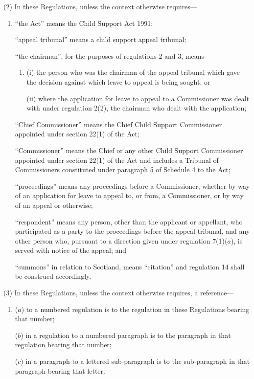 \documentclass[12pt,a4paper]{article}
\begin{document}
(2) In these Regulations, unless the context otherwise requires—
\begin{enumerate}\item[]
“the Act” means the Child Support Act 1991;

“appeal tribunal” means a child support appeal tribunal;

“the chairman”, for the purposes of regulations 2 and 3, means—
\begin{enumerate}\item[]
(i) the person who was the chairman of the appeal tribunal which gave the decision against which leave to appeal is being sought; or

(ii) where the application for leave to appeal to a Commissioner was dealt with under regulation 2(2), the chairman who dealt with the application;
\end{enumerate}

“Chief Commissioner” means the Chief Child Support Commissioner appointed under section 22(1) of the Act;

“Commissioner” means the Chief or any other Child Support Commissioner appointed under section 22(1) of the Act and includes a Tribunal of Commissioners constituted under paragraph 5 of Schedule 4 to the Act;

\begin{sloppypar}
“proceedings” means any proceedings before a Commissioner, whether by way of an application for leave to appeal to, or from, a Commissioner, or by way of an appeal or otherwise;
\end{sloppypar}

“respondent” means any person, other than the applicant or appellant, who participated as a party to the proceedings before the appeal tribunal, and any other person who, pursuant to a direction given under regulation 7(1)($a$), is served with notice of the appeal; and

“summons” in relation to Scotland, means “citation” and regulation 14 shall be construed accordingly.
\end{enumerate}

(3) In these Regulations, unless the context otherwise requires, a reference—
\begin{enumerate}\item[]
($a$) to a numbered regulation is to the regulation in these Regulations bearing that number;

($b$) in a regulation to a numbered paragraph is to the paragraph in that regulation bearing that number;

($c$) in a paragraph to a lettered sub-paragraph is to the sub-paragraph in that paragraph bearing that letter.
\end{enumerate}
\end{document}
